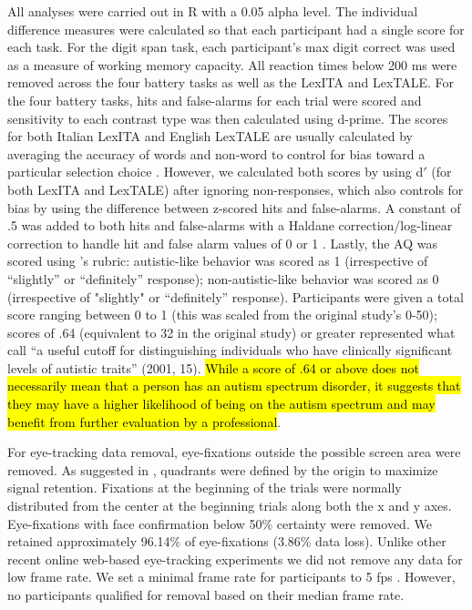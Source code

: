 All analyses were carried out in R \citep[version 4.2.2;][]{R} with a 0.05 alpha level. The individual difference measures were calculated so that each participant had a single score for each task. For the digit span task, each participant's max digit correct was used as a measure of working memory capacity. All reaction times below 200 ms were removed across the four battery tasks as well as the LexITA and LexTALE. For the four battery tasks, hits and false-alarms for each trial were scored and sensitivity to each contrast type was then calculated using d-prime. The scores for both Italian LexITA and English LexTALE are usually calculated by averaging the accuracy of words and non-word to control for bias toward a particular selection choice \citep{lemhofer2012introducing}. However, we calculated both scores by using d$'$ (for both LexITA and LexTALE) after ignoring non-responses, which also controls for bias by using the difference between z-scored hits and false-alarms. A constant of .5 was added to both hits and false-alarms with a Haldane correction/log-linear correction to handle hit and false alarm values of 0 or 1 \citep{Hautus1995}. Lastly, the AQ was scored using \cite{Baron-Cohen2001}'s rubric: autistic-like behavior was scored as 1 (irrespective of “slightly” or “definitely” response); non-autistic-like behavior was scored as 0 (irrespective of "slightly" or “definitely” response). Participants were given a total score ranging between 0 to 1 (this was scaled from the original study's 0-50); scores of .64 (equivalent to 32 in the original study) or greater represented what \cite{Baron-Cohen2001} call “a useful cutoff for distinguishing individuals who have clinically significant levels of autistic traits” (2001, 15). \hl{While a score of .64 or above does not necessarily mean that a person has an autism spectrum disorder, it suggests that they may have a higher likelihood of being on the autism spectrum and may benefit from further evaluation by a professional}. 

For eye-tracking data removal, eye-fixations outside the possible screen area were removed. As suggested in \cite{bramlett_wiener_24-AOW}, quadrants were defined by the origin to maximize signal retention. Fixations at the beginning of the trials were normally distributed from the center at the beginning trials along both the x and y axes. Eye-fixations with face confirmation below 50\% certainty were removed. We retained approximately 96.14\% of eye-fixations (3.86\% data loss). Unlike other recent online web-based eye-tracking experiments we did not remove any data for low frame rate. We set a minimal frame rate for participants to 5 fps \citep{Vos_2017}. However, no participants qualified for removal based on their median frame rate. 


